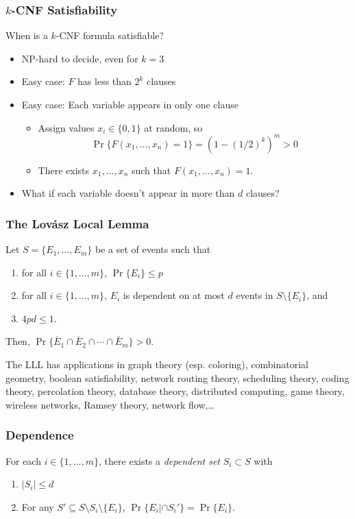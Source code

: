 \documentclass{beamer}
\begin{document}
\frame
{
  \frametitle{$k$-CNF Satisfiability}

  When is a $k$-CNF formula satisfiable? 

  \begin{itemize}
       \item NP-hard to decide, even for $k=3$ 
       \item Easy case: $F$ has less than $2^k$ clauses
       \item Easy case: Each variable appears in only one clause 
       \begin{itemize}
         \item Assign values $x_i\in \{0,1\}$ at random, so
         \[\Pr\{F(x_1,\ldots,x_n)=1\} = (1-(1/2)^k)^{m} > 0 \]
         \item There exists $x_1,\ldots,x_n$ such that $F(x_1,\ldots,x_n) = 1$.
       \end{itemize}
       \item What if each variable doesn't appear in more than $d$ clauses?
  \end{itemize} 
}


\frame
{
  \frametitle{The Lov\'asz Local Lemma}

  \begin{thm}
    Let $S=\{E_1,\ldots,E_m\}$ be a set of events such that
    \begin{enumerate}
      \item for all $i\in\{1,\ldots,m\}$, $\Pr\{E_i\} \le p$ 
      \item for all $i\in\{1,\ldots,m\}$, $E_i$ is dependent on at most $d$
events in $S\setminus \{E_i\}$, and 
      \item $4pd \le 1$.
    \end{enumerate}
    Then, $\Pr\{\bar E_1 \cap \bar E_2 \cap \cdots \cap \bar E_m\} > 0$.
  \end{thm}

  The LLL has applications in graph theory (esp. coloring), combinatorial geometry,
boolean satisfiability, network routing theory, scheduling theory, coding
theory, percolation theory, database theory, distributed computing, game
theory, wireless networks, Ramsey theory, network flow,\ldots

}

\frame
{
  \frametitle{Dependence}

  \begin{cond}
    For each $i\in\{1,\ldots,m\}$, 
    there exists a \emph{dependent set} $S_i\subset S$ with
    \begin{enumerate}
      \item $|S_i| \le d$
      \item For any $S'\subseteq S\setminus S_i\setminus \{E_i\}$, $\Pr\{ E_i | \cap S_i'\} = \Pr\{E_i\}.$ 
    \end{enumerate}
   \end{cond}
}
\end{document}
